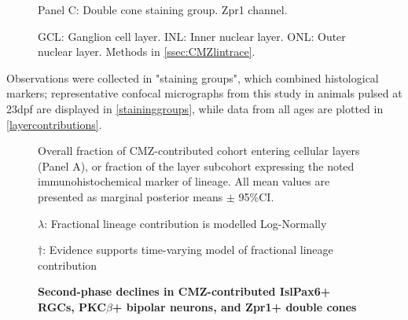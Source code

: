 \documentclass{ut-thesis}
\begin{document}
\begin{NoHyper}
\begin{figure}[!h]
    Panel C: Double cone staining group. Zpr1 channel.

    GCL: Ganglion cell layer. INL: Inner nuclear layer. ONL: Outer nuclear layer.
    Methods in \autoref{ssec:CMZlintrace}.
    \label{staininggroups}
\end{figure}

Observations were collected in "staining groups", which combined histological markers; representative confocal micrographs from this study in animals pulsed at 23dpf are displayed in \autoref{staininggroups}, while data from all ages are plotted in \autoref{layercontributions}.

\begin{figure}[!h]
    \caption{{\bf Second-phase declines in CMZ-contributed Isl\/Pax6+ RGCs, PKC$\beta$+ bipolar neurons, and Zpr1+ double cones}}
    Overall fraction of CMZ-contributed cohort entering cellular layers (Panel A), or fraction of the layer subcohort expressing the noted immunohistochemical marker of lineage. All mean values are presented as marginal posterior means $\pm$ 95\%CI.

    $\lambda$: Fractional lineage contribution is modelled Log-Normally

    $\dagger$: Evidence supports time-varying model of fractional lineage contribution


\end{figure}
\end{NoHyper}
\end{document}
